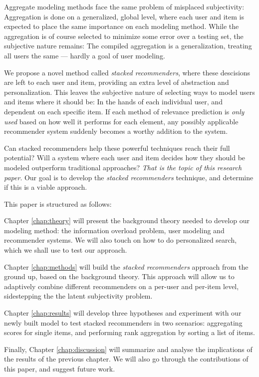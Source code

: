 Aggregate modeling methods face the same problem of misplaced subjectivity: 
Aggregation is done on a generalized, global level,
where each user and item is expected to place the same importance on each modeling method.
While the aggregation is of course selected to minimize some error over a testing set,
the subjective nature remains: The compiled aggregation is a generalization,
treating all users the same --- hardly a goal of user modeling.

We propose a novel method called \emph{stacked recommenders}, where these descisions are left to each user and item,
providing an extra level of abstraction and personalization.
This leaves the subjective nature of selecting ways to model users and items where it should be:
In the hands of each individual user, and dependent on each specific item.
If each method of relevance prediction is \emph{only used} based on how well it performs for each element,
any possibly applicable recommender system suddenly becomes a worthy addition to the system.

Can stacked recommenders help these powerful techniques reach their full potential?
Will a system where each user and item decides how they should be modeled outperform traditional approaches?
\emph{That is the topic of this research paper}.
Our goal is to develop the \emph{stacked recommenders} technique, and determine if this is a viable approach.



\hr

This paper is structured as follows:

Chapter \ref{chap:theory} will present the background theory needed to develop our modeling method:
the information overload problem, user modeling and recommender systems. We will also touch on
how to do personalized search, which we shall use to test our approach.

Chapter \ref{chap:methods} will build the \emph{stacked recommenders} approach from the ground up,
based on the background theory.
This approach will allow us to adaptively combine different recommenders
on a per-user and per-item level, sidestepping the the latent subjectivity problem.

Chapter \ref{chap:results} will develop three hypotheses and experiment with our newly built model
to test stacked recommenders in two scenarios:
aggregating scores for single items, and performing rank aggregation by sorting a list of items.

Finally, Chapter \ref{chap:discussion} will summarize and analyse the implications of 
the results of the previous chapter.
We will also go through the contributions of this paper, and suggest future work.



